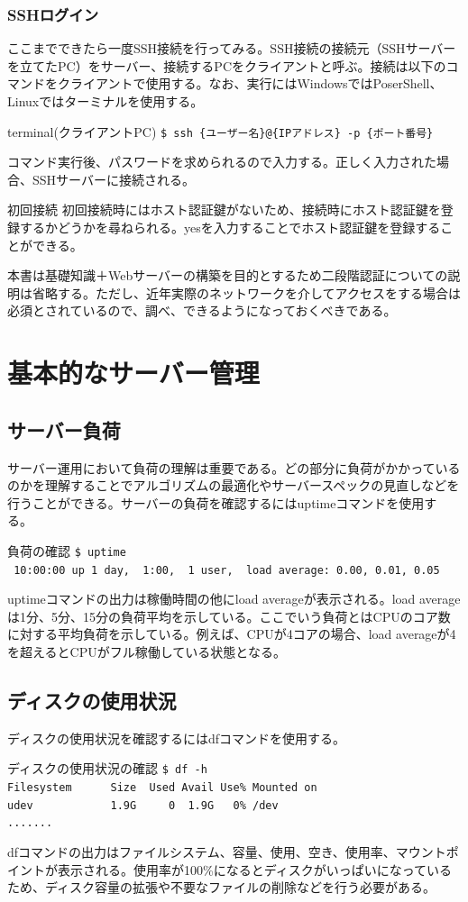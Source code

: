 \documentclass[a4paper, 11pt, dvipdfmx]{jsarticle}
\begin{document}
\subsubsection{SSHログイン}
ここまでできたら一度SSH接続を行ってみる。SSH接続の接続元（SSHサーバーを立てたPC）をサーバー、接続するPCをクライアントと呼ぶ。接続は以下のコマンドをクライアントで使用する。なお、実行にはWindowsではPoserShell、Linuxではターミナルを使用する。
\begin{commandbox}{terminal(クライアントPC)}
  \verb|$ ssh {ユーザー名}@{IPアドレス} -p {ポート番号}|
\end{commandbox}
コマンド実行後、パスワードを求められるので入力する。正しく入力された場合、SSHサーバーに接続される。
\begin{hosokubox}{初回接続}
  初回接続時にはホスト認証鍵がないため、接続時にホスト認証鍵を登録するかどうかを尋ねられる。yesを入力することでホスト認証鍵を登録することができる。
\end{hosokubox}
本書は基礎知識＋Webサーバーの構築を目的とするため二段階認証についての説明は省略する。ただし、近年実際のネットワークを介してアクセスをする場合は必須とされているので、調べ、できるようになっておくべきである。
\section{基本的なサーバー管理}
\subsection{サーバー負荷}
  サーバー運用において負荷の理解は重要である。どの部分に負荷がかかっているのかを理解することでアルゴリズムの最適化やサーバースペックの見直しなどを行うことができる。サーバーの負荷を確認するにはuptimeコマンドを使用する。
  \begin{commandbox}{負荷の確認}
    \verb|$ uptime|\\
    \verb| 10:00:00 up 1 day,  1:00,  1 user,  load average: 0.00, 0.01, 0.05|
  \end{commandbox}
  uptimeコマンドの出力は稼働時間の他にload averageが表示される。load averageは1分、5分、15分の負荷平均を示している。ここでいう負荷とはCPUのコア数に対する平均負荷を示している。例えば、CPUが4コアの場合、load averageが4を超えるとCPUがフル稼働している状態となる。
\subsection{ディスクの使用状況}
ディスクの使用状況を確認するにはdfコマンドを使用する。
  \begin{commandbox}{ディスクの使用状況の確認}
    \verb|$ df -h|\\
    \verb|Filesystem      Size  Used Avail Use% Mounted on|\\
    \verb|udev            1.9G     0  1.9G   0% /dev|\\
    \verb|.......|
  \end{commandbox}
  dfコマンドの出力はファイルシステム、容量、使用、空き、使用率、マウントポイントが表示される。使用率が100\%になるとディスクがいっぱいになっているため、ディスク容量の拡張や不要なファイルの削除などを行う必要がある。
\end{document}
